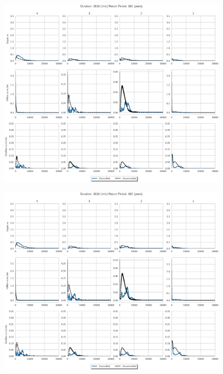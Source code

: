 \begin{figure}
    \centering
    \includegraphics[width=\linewidth]{./RL-SI-figures/77storms/0010001.eps}
\end{figure}
\begin{figure}
    \centering
    \includegraphics[width=\linewidth]{./RL-SI-figures/77storms/0010002.eps}
\end{figure}
